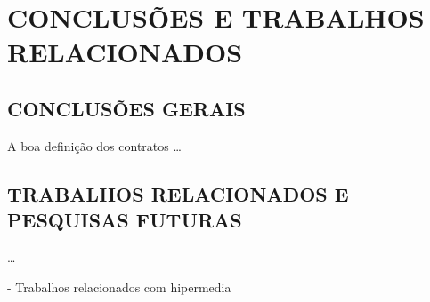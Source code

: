 
\chapter{CONCLUSÕES E TRABALHOS RELACIONADOS}
\vspace{-6mm}


\section{CONCLUSÕES GERAIS}
\vspace{-6mm}

A boa definição dos contratos \ldots 
\vspace{-6mm}


\section{TRABALHOS RELACIONADOS E PESQUISAS FUTURAS }
\vspace{-6mm}

\ldots

- Trabalhos relacionados com hipermedia
